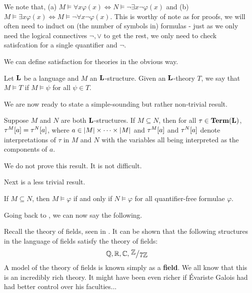 \begin{remark} %
     We note that, (a) $M \vDash \forall x \varphi(x)\iff N \vDash \neg \exists x \neg \varphi(x)$ and (b) $M \vDash \exists x \varphi(x) \iff M \vDash \neg \forall x \neg \varphi(x)$. This is worthy of note as for proofs, we will often need to induct on (the number of symbols in) formulas - just as we only need the logical connectives $\neg, \vee$ to get the rest, we only need to check satisfcation for a single quantifier and $\neg$.
\end{remark} %

We can define satisfaction for theories in the obvious way.

\begin{boxdefinition}
    Let $\mathbf{L}$ be a language and $M$ an $\mathbf{L}$-structure. Given an $\mathbf{L}$-theory $T$, we say that $M \models T$ if $M \models \psi$ for all $\psi \in T$.
\end{boxdefinition}

We are now ready to state a simple-sounding but rather non-trivial result.

\begin{boxlemma}
    Suppose $M$ and $N$ are both $\mathbf{L}$-structures. If $M \subseteq N$, then for all $\tau \in \mathbf{Term}\!\left( \mathbf{L} \right)$, $\tau^{M}\!\left[ a \right] = \tau^N\!\left[ a \right]$, where $a \in \left\lvert M \right\rvert \times \cdots \times \left\lvert M \right\rvert$ and $\tau^M\!\left[ a \right]$ and $\tau^N\!\left[ a \right]$ denote interpretations of $\tau$ in $M$ and $N$ with the variables all being interpreted as the components of $a$.
\end{boxlemma}

We do not prove this result. It is not difficult.

Next is a less trivial result.

\begin{boxlemma}
    If $M \subseteq N$, then $M \models \varphi$ if and only if $N \models \varphi$ for all quantifier-free formulae $\varphi$.
\end{boxlemma}


Going back to , we can now say the following.

\begin{boxexample}
    Recall the theory of fields, seen in . It can be shown that the following structures in the language of fields satisfy the theory of fields:
    \begin{align*}
        \Q, \R, \C, \quotient{\Z}{7\Z}
    \end{align*}
    A model of the theory of fields is known simply as a \textbf{field}. We all know that this is an incredibly rich theory. It might have been even richer if Évariste Galois had had better control over his faculties...
\end{boxexample}

